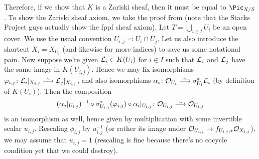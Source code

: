 \documentclass[a4paper,parskip=half,numbers=enddot, DIV=12]{scrreprt}
\begin{document}
\begin{example}
	Therefore, if we show that $K$ is a Zariski sheaf, then it must be equal to $\Pic_{X/S}$. To show the Zariski sheaf axiom, we take the proof from \cite[]{stacks-project} (note that the Stacks Project guys actually show the fppf sheaf axiom). Let $T=\bigcup_{i\in I}U_i$ be an open cover. We use the usual convention $U_{i,j}\eqqcolon U_i\cap U_j$. Let us also introduce the shortcut $X_i=X_{U_i}$ (and likewise for more indices) to save us some notational pain. Now suppose we're given $\mathcal{L}_i\in K(U_i)$ for $i\in I$ such that $\mathcal{L}_i$ and $\mathcal{L}_j$ have the same image in $K(U_{i,j})$. Hence we may fix isomorphisms $\phi_{i,j}\colon \Ll_i|_{X_{i,j}}\isomorphism\Ll_j|_{X_{i,j}}$, and also isomorphisms $\alpha_i\colon \Oo_{U_i}\isomorphism \sigma_{U_i}^*\Ll_i$ (by definition of $K(U_i)$). Then the composition
	\begin{align*}
		(\alpha_j|_{U_{i,j}})^{-1}\circ\sigma_{U_{i,j}}^*(\phi_{i,j})\circ\alpha_i|_{U_{i,j}}\colon \Oo_{U_{i,j}}\isomorphism \Oo_{U_{i,j}}
	\end{align*}
	is an isomorphism as well, hence given by multiplication with some invertible scalar $u_{i,j}$. Rescaling $\phi_{i,j}$ by $u_{i,j}^{-1}$ (or rather its image under $\Oo_{U_{i,j}}\morphism f_{U_{i,j},*}\Oo_{X_{i,j}}$), we may assume that $u_{i,j}=1$ (rescaling is fine because there's no cocycle condition yet that we could destroy).
	

\end{example}
\end{document}
